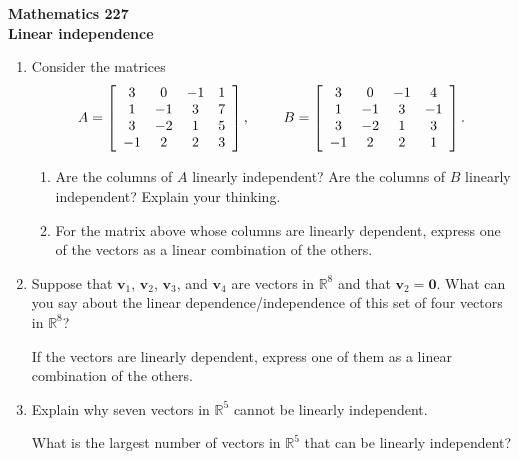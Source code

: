 \documentclass[12pt]{article}
\newcommand{\vs}[1]{\vspace{#1in}}
\newcommand{\vvec}{{\mathbf v}}
\newcommand{\zerovec}{{\mathbf 0}}
\newcommand{\real}{{\mathbb R}}
\begin{document}
\noindent
{\bf Mathematics 227} \\ 
{\bf Linear independence}

\bigskip
\begin{enumerate}
\item Consider the matrices 
  $$
  A = 
  \left[
    \begin{array}{cccc}
      3 & 0 & -1 & 1 \\
      1 & -1 & 3 & 7 \\
      3 & -2 & 1 & 5 \\
      -1 & 2 & 2 & 3 \\
    \end{array}
  \right],\hspace*{24pt}
  B = 
  \left[
    \begin{array}{cccc}
      3 & 0 & -1 & 4 \\
      1 & -1 & 3 & -1 \\
      3 & -2 & 1 & 3 \\
      -1 & 2 & 2 & 1 \\
    \end{array}
  \right].
  $$

  \begin{enumerate}[label=(\alph*)]
  \item  Are the columns of $A$ linearly independent?  Are the columns
    of $B$ linearly independent?   Explain your thinking.

    \vs{1.5}
  \item For the matrix above whose columns are linearly dependent,
    express one of the vectors as a linear combination of the others.

    \vs{1.5}
  \end{enumerate}

\item  Suppose that $\vvec_1$, $\vvec_2$, $\vvec_3$, and $\vvec_4$ are
  vectors in $\real^8$ and that $\vvec_2=\zerovec$.  What can you say
  about the linear dependence/independence of this set of
  four vectors in $\real^8$?

  \vs{1}
  If the vectors are linearly dependent, express one of them as a
  linear combination of the others.

  \vs{1}
  
\item  Explain why seven vectors in $\real^5$ cannot be linearly
  independent.

  \vs{1}
  What is the largest number of vectors in $\real^5$ that can be
  linearly independent?


\end{enumerate}
\end{document}
